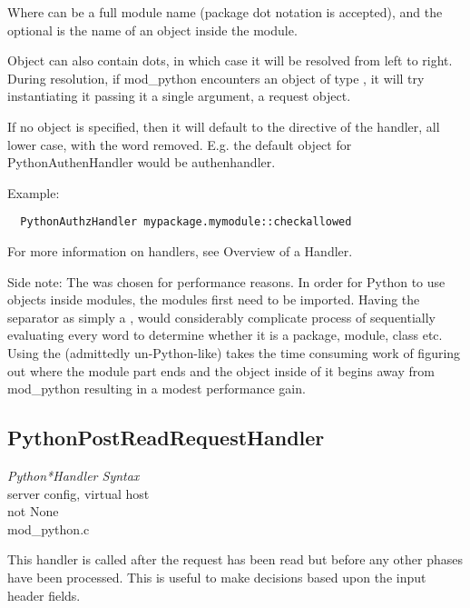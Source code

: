 Where  can be a full module name (package dot notation is
accepted), and the optional  is the name of an object
inside the module.

Object can also contain dots, in which case it will be resolved from
left to right. During resolution, if mod_python encounters an object
of type , it will try instantiating it passing it a single
argument, a request object.

If no object is specified, then it will default to the directive of
the handler, all lower case, with the word 
removed. E.g. the default object for PythonAuthenHandler would be
authenhandler.

Example: 

\begin{verbatim}
  PythonAuthzHandler mypackage.mymodule::checkallowed
\end{verbatim}

For more information on handlers, see Overview of a Handler.

Side note: The \samp{::} was chosen for performance reasons. In order for
Python to use objects inside modules, the modules first need to be
imported. Having the separator as simply a , would considerably
complicate process of sequentially evaluating every word to determine
whether it is a package, module, class etc. Using the (admittedly
un-Python-like) \samp{::} takes the time consuming work of figuring out
where the module part ends and the object inside of it begins away
from mod_python resulting in a modest performance gain.

\subsection{PythonPostReadRequestHandler\label{dir-handlers-prrh}}

\emph{Python*Handler Syntax}\\
server config, virtual host\\
not None\\
mod_python.c

This handler is called after the request has been read but before any
other phases have been processed. This is useful to make decisions
based upon the input header fields.

